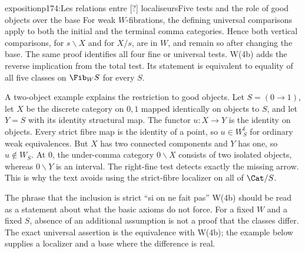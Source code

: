 \begin{dcomment}{exposition}{p174:Les relations entre [?] localiseurs}{Five tests and the role of good objects over the base}
For weak $W$-fibrations, the defining universal comparisons apply to both the initial and the terminal comma categories. Hence both vertical comparisons, for $s\backslash X$ and for $X/s$, are in $W$, and remain so after changing the base. The same proof identifies all four fine or universal tests. W(4b) adds the reverse implication from the total test. Its statement is equivalent to equality of all five classes on $\Fib_W S$ for every $S$.

A two-object example explains the restriction to good objects. Let $S=(0\to1)$, let $X$ be the discrete category on $0,1$ mapped identically on objects to $S$, and let $Y=S$ with its identity structural map. The functor $u:X\to Y$ is the identity on objects. Every strict fibre map is the identity of a point, so $u\in W_S^{\mathrm f}$ for ordinary weak equivalences. But $X$ has two connected components and $Y$ has one, so $u\notin W_S$. At $0$, the under-comma category $0\backslash X$ consists of two isolated objects, whereas $0\backslash Y$ is an interval. The right-fine test detects exactly the missing arrow. This is why the text avoids using the strict-fibre localizer on all of $\Cat/S$.

The phrase that the inclusion is strict ``si on ne fait pas'' W(4b) should be read as a statement about what the basic axioms do not force. For a fixed $W$ and a fixed $S$, absence of an additional assumption is not a proof that the classes differ. The exact universal assertion is the equivalence with W(4b); the example below supplies a localizer and a base where the difference is real.
\end{dcomment}

